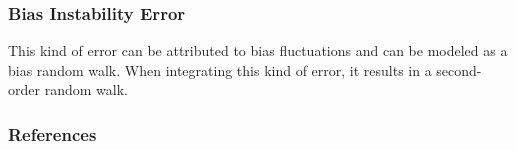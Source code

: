 \documentclass[10pt]{beamer}
\begin{document}
\begin{frame}
\frametitle{Bias Instability Error}
This kind of error can be attributed to bias fluctuations and can be modeled as a bias random walk. When integrating this kind of error, it results in a second-order random walk.  
\end{frame}

\begin{frame}
\frametitle{References}


\end{frame}
\end{document}
